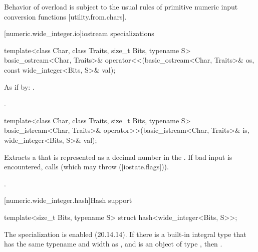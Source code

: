 Behavior of  overload is subject to the usual rules of primitive numeric input conversion functions [utility.from.chars].

[numeric.wide_integer.io]{iostream specializations}

\begin{itemdecl}
template<class Char, class Traits, size_t Bits, typename S>
  basic_ostream<Char, Traits>& operator<<(basic_ostream<Char, Traits>& os,
                                          const wide_integer<Bits, S>& val);
\end{itemdecl}

\begin{itemdescr}
\pnum
\effects As if by: .

\pnum
\returns {}.
\end{itemdescr}

\begin{itemdecl}
template<class Char, class Traits, size_t Bits, typename S>
  basic_istream<Char, Traits>& operator>>(basic_istream<Char, Traits>& is,
                                          wide_integer<Bits, S>& val);
\end{itemdecl}

\begin{itemdescr}
\pnum
\effects Extracts a  that is represented as a decimal number in the . If bad input is encountered, calls  (which may throw  ([iostate.flags])).
    
\pnum
\returns {}.
\end{itemdescr}

[numeric.wide_integer.hash]{Hash support}

\begin{itemdecl}
template<size_t Bits, typename S> struct hash<wide_integer<Bits, S>>;
\end{itemdecl}

The specialization is enabled (20.14.14). If there is a built-in integral type  that has the same typename and width as , and  is an object of type , then .